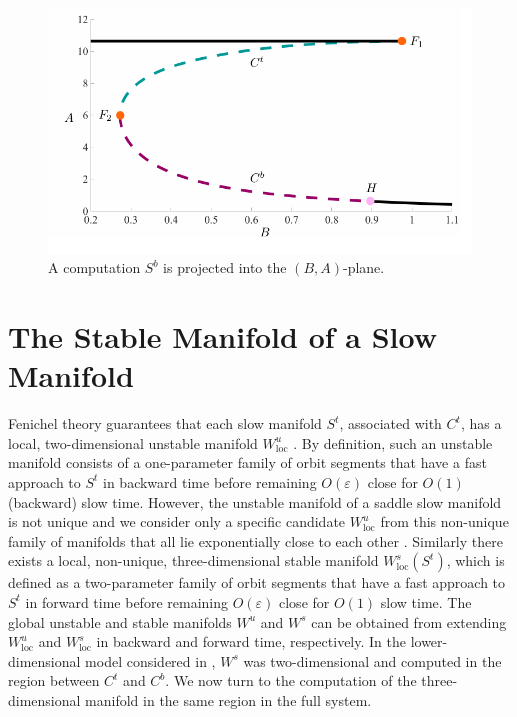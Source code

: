 \documentclass{ws-ijbc}
\begin{document}
\begin{figure}[!t]
\begin{center}
\includegraphics[page=14, width=\textwidth]{figures.pdf}
\end{center}
\caption{A computation $S^b$ is projected into the $(B,A)$-plane.}
\label{tube_figure}
\end{figure}


\section{The Stable Manifold of a Slow Manifold}

Fenichel theory guarantees that each slow manifold $S^t$, associated with $C^t$, has a local, two-dimensional unstable manifold $W_{\mathrm{loc}}^u$ \cite{Fenichel}.  By definition, such an unstable manifold consists of a one-parameter family of orbit segments that have a fast approach to $S^t$ in backward time before remaining $O(\varepsilon)$ close for $O(1)$ (backward) slow time.  However, the unstable manifold of a saddle slow manifold is not unique and we consider only a specific candidate $W_{\mathrm{loc}}^u$ from this non-unique family of manifolds that all lie exponentially close to each other \cite{Fenichel}.  Similarly there exists a local, non-unique, three-dimensional stable manifold $W^s_{\mathrm{loc}}(S^t)$, which is defined as a two-parameter family of orbit segments that have a fast approach to $S^t$ in forward time before remaining $O(\varepsilon)$ close for $O(1)$ slow time.  The global unstable and stable manifolds $W^u$ and $W^s$ can be obtained from extending $W^u_{\mathrm{loc}}$ and $W^s_{\mathrm{loc}}$ in backward and forward time, respectively.  In the lower-dimensional model considered in \cite{QSSA}, $W^s$ was two-dimensional and computed in the region between $C^t$ and $C^b$.  We now turn to the computation of the three-dimensional manifold in the same region in the full system.
    
\end{document}
